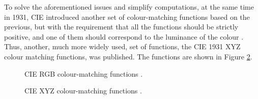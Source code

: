 To solve the aforementioned issues and simplify computations, at the same time in 1931, CIE introduced another set of colour-matching functions based on the previous, but with the requirement that all the functions should be strictly positive, and one of them should correspond to the luminance of the colour \cite[32-33]{measuringcolour}. Thus, another, much more widely used, set of functions, the CIE 1931 XYZ colour matching functions, was published. The functions are shown in Figure \ref{fig:xyz}.

\begin{figure}
    \centering
    \caption{CIE RGB colour-matching functions \cite{cie1931}.}
    \label{fig:ciergb}
\end{figure}

\begin{figure}
    \centering
    \caption{CIE XYZ colour-matching functions \cite{cie1931}.}
    \label{fig:xyz}
\end{figure}

